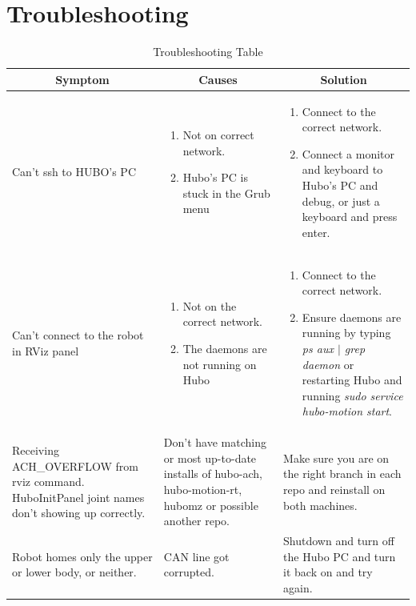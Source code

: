 \documentclass[letterpaper, 10 pt]{report}
\begin{document}
\chapter{Troubleshooting}\label{chap:troubleshooting}
\begin{table}[ht]
  \centering
  \caption{Troubleshooting Table}
  \begin{tabular}{|p{4.5cm}|p{4.5cm}|p{4.5cm}|} \hline
    \multicolumn{1}{|c|}{Symptom} & \multicolumn{1}{|c|}{Causes} & \multicolumn{1}{|c|}{Solution} \\ \hline
    Can't ssh to HUBO's PC & \begin{enumerate} \item Not on correct network. \item Hubo's PC is stuck in the Grub menu \end{enumerate} & \begin{enumerate} \item Connect to the correct network. \item Connect a monitor and keyboard to Hubo's PC and debug, or just a keyboard and press enter. \end{enumerate} \\
    \hline
    Can't connect to the robot in RViz panel & \begin{enumerate} \item Not on the correct network. \item The daemons are not running on Hubo \end{enumerate} & \begin{enumerate} \item Connect to the correct network. \item Ensure daemons are running by typing \textit{ps aux $|$ grep daemon} or restarting Hubo and running \textit{sudo service hubo-motion start}. \end{enumerate} \\
    \hline
    Receiving ACH\_OVERFLOW from rviz command. \newline HuboInitPanel joint names don't showing up correctly. & Don't have matching or most up-to-date installs of hubo-ach, hubo-motion-rt, hubomz or possible another repo. & Make sure you are on the right branch in each repo and reinstall on both machines. \\
    \hline
    Robot homes only the upper or lower body, or neither. & CAN line got corrupted. & Shutdown and turn off the Hubo PC and turn it back on and try again. \\
    \hline
  \end{tabular} \label{tbl:troubleshooting}
\end{table}

%

\end{document}
